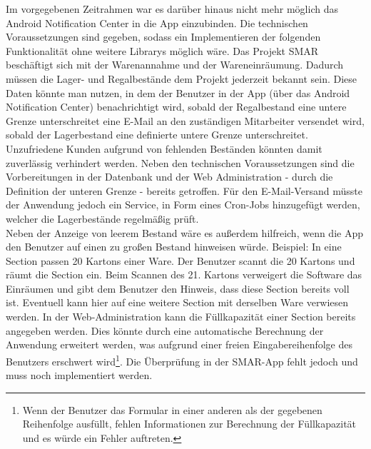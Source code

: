 Im vorgegebenen Zeitrahmen war es darüber hinaus nicht mehr möglich das Android Notification Center in die App einzubinden. Die technischen Voraussetzungen sind gegeben, sodass ein Implementieren der folgenden Funktionalität ohne weitere Librarys möglich wäre. Das Projekt \ac{SMAR} beschäftigt sich mit der Warenannahme und der Wareneinräumung. Dadurch müssen die Lager- und Regalbestände dem Projekt jederzeit bekannt sein. Diese Daten könnte man nutzen, in dem der Benutzer in der App (\zB über das Android Notification Center) benachrichtigt wird, sobald der Regalbestand eine untere Grenze unterschreitet \bzw eine E-Mail an den zuständigen Mitarbeiter versendet wird, sobald der Lagerbestand eine definierte untere Grenze unterschreitet. Unzufriedene Kunden aufgrund von fehlenden Beständen könnten damit zuverlässig verhindert werden. Neben den technischen Voraussetzungen sind die Vorbereitungen in der Datenbank und der Web Administration - durch die Definition der unteren Grenze - bereits getroffen. Für den E-Mail-Versand müsste der Anwendung jedoch ein Service, \zB in Form eines Cron-Jobs hinzugefügt werden, welcher die Lagerbestände regelmäßig prüft.\\

Neben der Anzeige von leerem Bestand wäre es außerdem hilfreich, wenn die App den Benutzer auf einen zu großen Bestand hinweisen würde.
Beispiel: In eine Section passen 20 Kartons einer Ware. Der Benutzer scannt die 20 Kartons und räumt die Section ein. Beim Scannen des 21. Kartons verweigert die Software das Einräumen und gibt dem Benutzer den Hinweis, dass diese Section bereits voll ist. Eventuell kann hier auf eine weitere Section mit derselben Ware verwiesen werden.
In der Web-Administration kann die Füllkapazität einer Section bereits angegeben werden. Dies könnte durch eine automatische Berechnung der Anwendung erweitert werden, was aufgrund einer freien Eingabereihenfolge des Benutzers erschwert wird\footnote{Wenn der Benutzer das Formular in einer anderen als der gegebenen Reihenfolge ausfüllt, fehlen Informationen zur Berechnung der Füllkapazität und es würde ein Fehler auftreten.}. Die Überprüfung in der \ac{SMAR}-App fehlt jedoch und muss noch implementiert werden.\\

